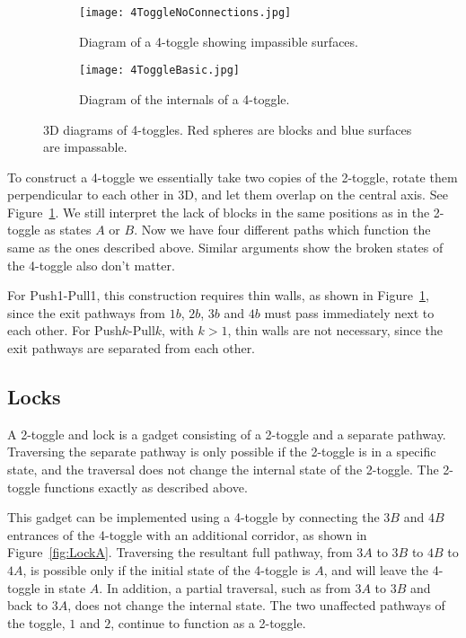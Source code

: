 \begin{figure}[!ht]
  \centering
  \begin{subfigure}[t]{.45\textwidth}
    \texttt{[image: 4ToggleNoConnections.jpg]}
    \caption{Diagram of a 4-toggle showing impassible surfaces.}
    \label{fig:4Toggle3D}
  \end{subfigure}
  \hfill
  \begin{subfigure}[t]{.45\textwidth}
    \texttt{[image: 4ToggleBasic.jpg]}
    \caption{Diagram of the internals of a 4-toggle.}
    \label{fig:4Toggle3DBasic}
  \end{subfigure}
  \caption{3D diagrams of 4-toggles. Red spheres are blocks and blue surfaces are impassable.}
\end{figure}

To construct a 4-toggle we essentially take two copies of the 2-toggle, rotate them perpendicular to each other in 3D, and let them overlap on the central axis. See Figure~\ref{fig:4Toggle3D}. We still interpret the lack of blocks in the same positions as in the 2-toggle as states $A$ or $B$. Now we have four different paths which function the same as the ones described above. Similar arguments show the broken states of the 4-toggle also don't matter.

For Push1-Pull1, this construction requires thin walls, as shown in Figure~\ref{fig:4Toggle3D}, since the exit pathways from $1b$, $2b$, $3b$ and $4b$ must pass immediately next to each other. For Push$k$-Pull$k$, with $k > 1$, thin walls are not necessary, since the exit pathways are separated from each other.
\subsection{Locks}


A 2-toggle and lock is a gadget consisting of a 2-toggle and a separate pathway. Traversing the separate pathway is only possible if the 2-toggle is in a specific state, and the traversal does not change the internal state of the 2-toggle. The 2-toggle functions exactly
as described above.

This gadget can be implemented using a 4-toggle by
connecting the $3B$ and $4B$ entrances of the 4-toggle with an additional corridor, as shown in Figure~\ref{fig:LockA}.
Traversing the resultant full pathway, from $3A$ to $3B$ to $4B$ to $4A$, is possible only if the initial
state of the 4-toggle is $A$, and will leave the 4-toggle in state $A$. In addition, a partial traversal,
such as from $3A$ to $3B$ and back to $3A$, does not change the internal state. The two unaffected
pathways of the toggle, $1$ and $2$, continue to function as a 2-toggle.

